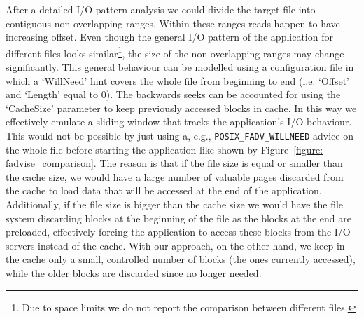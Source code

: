 After a detailed I/O pattern analysis we could divide the target file into contiguous non overlapping ranges. Within these ranges reads happen to have increasing offset. %
Even though the general I/O pattern of the application for different files looks similar\footnote{Due to space limits we do not report the comparison between different files.}, the size of the non overlapping ranges may change significantly. This general behaviour can be modelled using a configuration file in which a `WillNeed' hint covers the whole file from beginning to end (i.e. `Offset' and `Length' equal to 0). The backwards seeks can be accounted for using the `CacheSize' parameter to keep previously accessed blocks in cache. In this way we effectively emulate a sliding window that tracks the application's I/O behaviour. This would not be possible by just using a, e.g., \texttt{POSIX\_FADV\_WILLNEED} advice on the whole file before starting the application like shown by Figure~\ref{figure: fadvise_comparison}. The reason is that if the file size is equal or smaller than the cache size, we would have a large number of valuable pages discarded from the cache to load data that will be accessed at the end of the application. Additionally, if the file size is bigger than the cache size we would have the file system discarding blocks at the beginning of the file as the blocks at the end are preloaded, effectively forcing the application to access these blocks from the I/O servers instead of the cache. With our approach, on the other hand, we keep in the cache only a small, controlled number of blocks (the ones currently accessed), while the older blocks are discarded since no longer needed. %

